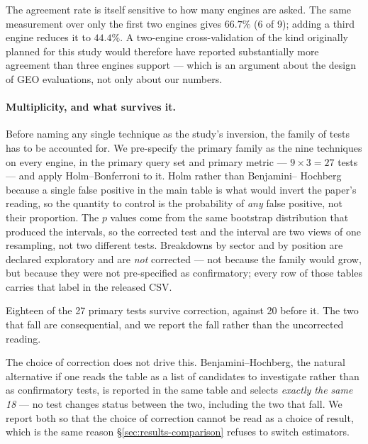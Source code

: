 \documentclass[11pt,a4paper]{article}
\begin{document}
The agreement rate is itself sensitive to how many engines are asked. The
same measurement over only the first two engines gives $66.7\%$ (6 of 9);
adding a third engine reduces it to $44.4\%$. A two-engine cross-validation
of the kind originally planned for this study would therefore have reported
substantially more agreement than three engines support --- which is an
argument about the design of GEO evaluations, not only about our numbers.

\paragraph{Multiplicity, and what survives it.} Before naming any single
technique as the study's inversion, the family of tests has to be accounted
for. We pre-specify the primary family as the nine techniques on every
engine, in the primary query set and primary metric --- $9 \times 3 = 27$
tests --- and apply Holm--Bonferroni to it. Holm rather than Benjamini--%
Hochberg because a single false positive in the main table is what would
invert the paper's reading, so the quantity to control is the probability of
\emph{any} false positive, not their proportion. The $p$ values come from the
same bootstrap distribution that produced the intervals, so the corrected
test and the interval are two views of one resampling, not two different
tests. Breakdowns by sector and by position are declared exploratory and are
\emph{not} corrected --- not because the family would grow, but because they
were not pre-specified as confirmatory; every row of those tables carries
that label in the released CSV.

Eighteen of the 27 primary tests survive correction, against 20 before it.
The two that fall are consequential, and we report the fall rather than the
uncorrected reading.

The choice of correction does not drive this. Benjamini--Hochberg, the
natural alternative if one reads the table as a list of candidates to
investigate rather than as confirmatory tests, is reported in the same table
and selects \emph{exactly the same 18} --- no test changes status between
the two, including the two that fall. We report both so that the choice of
correction cannot be read as a choice of result, which is the same reason
\S\ref{sec:results-comparison} refuses to switch estimators.
\end{document}
